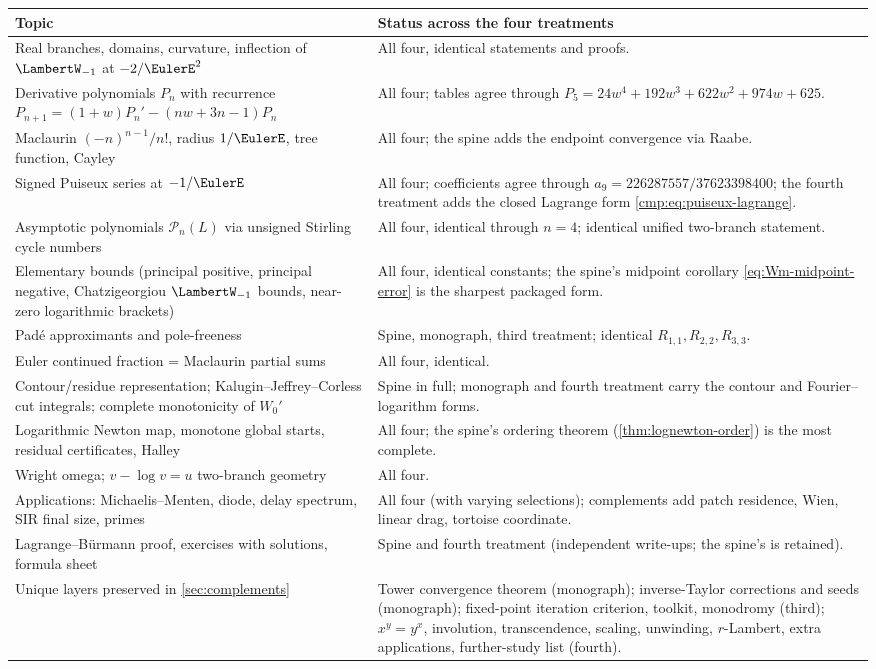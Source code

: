 \documentclass[11pt]{article}
\theoremstyle{remark}
\newcommand{\Wm}{\LambertW_{-1}}
\begin{document}
\begin{longtable}{@{}p{}p{}@{}}
\toprule
Topic & Status across the four treatments\\
\midrule
\endhead
Real branches, domains, curvature, inflection of \(\Wm\) at \(-2/\EulerE^2\) &
All four, identical statements and proofs.\\
\addlinespace
Derivative polynomials \(P_n\) with recurrence
\(P_{n+1}=(1+w)P_n'-(nw+3n-1)P_n\) &
All four; tables agree through \(P_5=24w^4+192w^3+622w^2+974w+625\).\\
\addlinespace
Maclaurin \((-n)^{n-1}/n!\), radius \(1/\EulerE\), tree function, Cayley &
All four; the spine adds the endpoint convergence via Raabe.\\
\addlinespace
Signed Puiseux series at \(-1/\EulerE\) &
All four; coefficients agree through \(a_9=226287557/37623398400\);
the fourth treatment adds the closed Lagrange form
\eqref{cmp:eq:puiseux-lagrange}.\\
\addlinespace
Asymptotic polynomials \(\mathcal P_n(L)\) via unsigned Stirling cycle
numbers &
All four, identical through \(n=4\); identical unified two-branch
statement.\\
\addlinespace
Elementary bounds (principal positive, principal negative, Chatzigeorgiou
\(\Wm\) bounds, near-zero logarithmic brackets) &
All four, identical constants; the spine's midpoint corollary
\eqref{eq:Wm-midpoint-error} is the sharpest packaged form.\\
\addlinespace
Pad\'e approximants and pole-freeness &
Spine, monograph, third treatment; identical
\(R_{1,1},R_{2,2},R_{3,3}\).\\
\addlinespace
Euler continued fraction = Maclaurin partial sums &
All four, identical.\\
\addlinespace
Contour/residue representation; Kalugin--Jeffrey--Corless cut integrals;
complete monotonicity of \(W_0'\) &
Spine in full; monograph and fourth treatment carry the contour and
Fourier--logarithm forms.\\
\addlinespace
Logarithmic Newton map, monotone global starts, residual certificates,
Halley &
All four; the spine's ordering theorem
(\cref{thm:lognewton-order}) is the most complete.\\
\addlinespace
Wright omega; \(v-\log v=u\) two-branch geometry &
All four.\\
\addlinespace
Applications: Michaelis--Menten, diode, delay spectrum, SIR final size,
primes &
All four (with varying selections); complements add patch residence, Wien,
linear drag, tortoise coordinate.\\
\addlinespace
Lagrange--B\"urmann proof, exercises with solutions, formula sheet &
Spine and fourth treatment (independent write-ups; the spine's is
retained).\\
\addlinespace
Unique layers preserved in \cref{sec:complements} &
Tower convergence theorem (monograph); inverse-Taylor corrections and seeds
(monograph); fixed-point iteration criterion, toolkit, monodromy (third);
\(x^y=y^x\), involution, transcendence, scaling, unwinding, \(r\)-Lambert,
extra applications, further-study list (fourth).\\
\bottomrule
\end{longtable}
\end{document}
